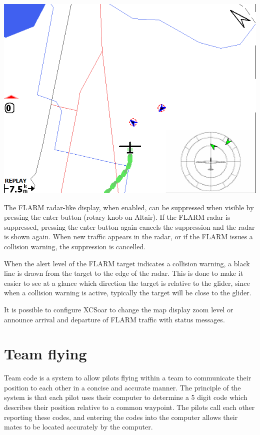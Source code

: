 \documentclass[a4paper,12pt]{refrep}
\begin{document}
\begin{description}
\begin{center}
\includegraphics[angle=0,width=\linewidth,keepaspectratio='true']{figures/flarmmap-alt.png}
\end{center}

\end{description}

The FLARM radar-like display, when enabled, can be suppressed when
visible by pressing the enter button (rotary knob on Altair).  If the
FLARM radar is suppressed, pressing the enter button again cancels the
suppression and the radar is shown again.  When new traffic appears in
the radar, or if the FLARM issues a collision warning, the suppression
is cancelled.

When the alert level of the FLARM target indicates a collision
warning, a black line is drawn from the target to the edge of the
radar.  This is done to make it easier to see at a glance which
direction the target is relative to the glider, since when a collision
warning is active, typically the target will be close to the glider.

\tip It is possible to configure XCSoar to change the map display zoom
level or announce arrival and departure of FLARM traffic with status
messages.

\section{Team flying}

  Team code is a system to allow pilots flying within a team to
  communicate their position to each other in a concise and accurate
  manner.  The principle of the system is that each pilot uses their
  computer to determine a 5 digit code which describes their position
  relative to a common waypoint.  The pilots call each other reporting
  these codes, and entering the codes into the computer allows their
  mates to be located accurately by the computer.
\end{document}
